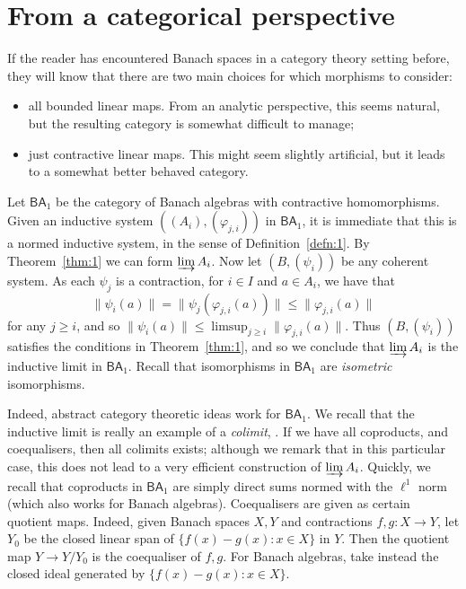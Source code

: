 \documentclass[a4paper,11pt]{article}
\newcommand{\indlim}{\varinjlim}
\newcommand{\ba}{\textsf{BA}}
\theoremstyle{definition}
\begin{document}
\section{From a categorical perspective}

If the reader has encountered Banach spaces in a category theory setting before, they will know that
there are two main choices for which morphisms to consider:
\begin{itemize}
\item all bounded linear maps.  From an analytic perspective, this seems natural, but the resulting
category is somewhat difficult to manage;
\item just contractive linear maps.  This might seem slightly artificial, but it leads to a somewhat
better behaved category.
\end{itemize}

Let $\ba_1$ be the category of Banach algebras with contractive homomorphisms.  Given an inductive
system $((A_i), (\varphi_{j,i}))$ in $\ba_1$, it is immediate that this is a normed inductive
system, in the sense of Definition~\ref{defn:1}.  By Theorem~\ref{thm:1} we can form
$\indlim A_i$.  Now let $(B,(\psi_i))$ be any coherent system.
As each $\psi_j$ is a contraction, for $i\in I$ and $a\in A_i$, we have that
\[ \|\psi_i(a)\| = \|\psi_j(\varphi_{j,i}(a))\|
\leq \|\varphi_{j,i}(a)\| \]
for any $j\geq i$, and so $\|\psi_i(a)\| \leq \limsup_{j\geq i}\|\varphi_{j,i}(a)\|$.
Thus $(B,(\psi_i))$ satisfies the conditions in Theorem~\ref{thm:1}, and so we conclude that
$\indlim A_i$ is the inductive limit in $\ba_1$.  Recall that isomorphisms in $\ba_1$ are
\emph{isometric} isomorphisms.

Indeed, abstract category theoretic ideas work for $\ba_1$.  We recall that the inductive limit is
really an example of a \emph{colimit}, \cite[Chapter~5]{leinster}.  If we have all coproducts, and
coequalisers, then all colimits exists; although we remark that in this particular case, this does
not lead to a very efficient construction of $\indlim A_i$.  Quickly, we recall that coproducts in
$\ba_1$ are simply direct sums normed with the $\ell^1$ norm (which also works for Banach algebras).
Coequalisers are given as certain quotient maps.  Indeed, given Banach spaces $X,Y$ and contractions
$f,g:X\rightarrow Y$, let $Y_0$ be the closed linear span of $\{ f(x)-g(x) : x\in X \}$ in $Y$.
Then the quotient map $Y\rightarrow Y/Y_0$ is the coequaliser of $f,g$.  For Banach algebras, take
instead the closed ideal generated by $\{ f(x)-g(x) : x\in X \}$.
\end{document}
